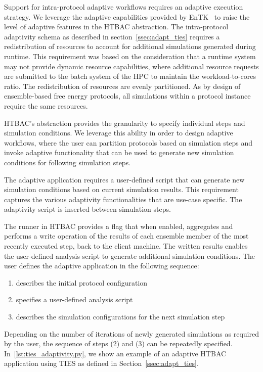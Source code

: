 Support for intra-protocol adaptive workflows requires an adaptive execution 
strategy. We leverage the adaptive capabilities provided by 
EnTK~\cite{adaptivebiomolecular} to raise the level of adaptive features 
in the HTBAC abstraction. The intra-protocol adaptivity schema as described in 
section~\ref{ssec:adapt_ties} requires a redistribution of resources to account 
for additional simulations generated during runtime. This requirement was based 
on the consideration that a runtime system may not provide dynamic resource 
capabilities, where additional resource requests are submitted to the batch 
system of the HPC to maintain the workload-to-cores ratio. The redistribution 
of resources are evenly partitioned. As by design of ensemble-based free energy 
protocols, all simulations within a protocol instance require the same 
resources. 

HTBAC's abstraction provides the granularity to specify individual steps and 
simulation conditions. We leverage this ability in order to design adaptive 
workflows, where the user can partition protocols based on simulation steps and 
invoke adaptive functionality that can be used to generate new simulation 
conditions for following simulation steps. 

The adaptive application requires a user-defined script that can generate new 
simulation conditions based on current simulation results. This requirement 
captures the various adaptivity functionalities that are use-case specific. 
The adaptivity script is inserted between simulation steps. 

The runner in HTBAC provides a flag that when enabled, aggregates and performs a 
write operation of the results of each ensemble member of the most recently 
executed step, back to the client machine. The written results enables the  
user-defined analysis script to generate additional simulation conditions. The 
user defines the adaptive application in the following sequence: 

\begin{enumerate}
  \item describes the initial protocol configuration
  \item specifies a user-defined analysis script 
  \item describes the simulation configurations for the next simulation step
\end{enumerate}

Depending on the number of iterations of newly generated simulations as required 
by the user, the sequence of steps (2) and (3) can be repeatedly specified.
In~\ref{lst:ties_adaptivity.py}, we show an example of an adaptive HTBAC 
application using TIES as defined in Section~\ref{ssec:adapt_ties}. 

